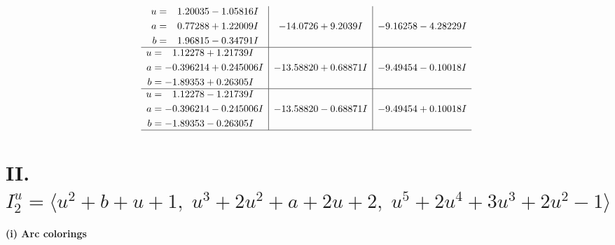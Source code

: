 \documentclass[1p]{elsarticle_modified}
\theoremstyle{definition}
\begin{document}
$$\begin{array}{c|c|c}
\begin{aligned}
u &= \phantom{-}1.20035 - 1.05816 I \\
a &= \phantom{-}0.77288 + 1.22009 I \\
b &= \phantom{-}1.96815 - 0.34791 I\end{aligned}
 & -14.0726 + 9.2039 I & -9.16258 - 4.28229 I \\ \hline\begin{aligned}
u &= \phantom{-}1.12278 + 1.21739 I \\
a &= -0.396214 + 0.245006 I \\
b &= -1.89353 + 0.26305 I\end{aligned}
 & -13.58820 + 0.68871 I & -9.49454 - 0.10018 I \\ \hline\begin{aligned}
u &= \phantom{-}1.12278 - 1.21739 I \\
a &= -0.396214 - 0.245006 I \\
b &= -1.89353 - 0.26305 I\end{aligned}
 & -13.58820 - 0.68871 I & -9.49454 + 0.10018 I\\
 \hline 
 \end{array}$$\newpage\newpage\renewcommand{\arraystretch}{1}
\centering \section*{II. $I^u_{2}= \langle u^2+b+u+1,\;u^3+2 u^2+a+2 u+2,\;u^5+2 u^4+3 u^3+2 u^2-1 \rangle$}
\flushleft \textbf{(i) Arc colorings}\\
\end{document}
